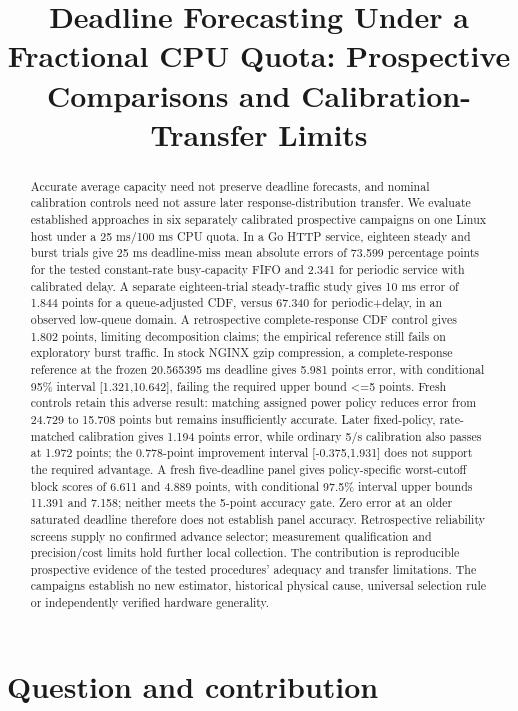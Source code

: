\documentclass[11pt,a4paper]{article}
\title{Deadline Forecasting Under a Fractional CPU Quota: Prospective Comparisons and Calibration-Transfer Limits}
\author{}
\date{}
\begin{document}
\maketitle
\begin{abstract}

Accurate average capacity need not preserve deadline forecasts, and nominal
calibration controls need not assure later response-distribution transfer.
We evaluate established approaches in six separately calibrated prospective
campaigns on one Linux host under a 25 ms/100 ms CPU quota. In a Go HTTP
service, eighteen steady and burst trials give 25 ms deadline-miss mean absolute
errors of 73.599 percentage points for the tested constant-rate busy-capacity
FIFO and 2.341 for periodic service with calibrated delay. A separate eighteen-trial
steady-traffic study gives 10 ms error of 1.844 points for a queue-adjusted CDF,
versus 67.340 for periodic+delay, in an observed low-queue domain. A retrospective
complete-response CDF control gives 1.802 points, limiting decomposition claims;
the empirical reference still fails on exploratory burst traffic. In stock
NGINX gzip compression, a complete-response reference at the frozen 20.565395 ms
deadline gives 5.981 points error, with conditional 95\% interval [1.321,10.642],
failing the required upper bound <=5 points. Fresh controls retain this adverse
result: matching assigned power policy reduces error from 24.729 to 15.708
points but remains insufficiently accurate. Later fixed-policy, rate-matched
calibration gives 1.194 points error, while ordinary 5/s calibration also passes
at 1.972 points; the 0.778-point improvement interval [-0.375,1.931] does not
support the required advantage. A fresh five-deadline panel gives policy-specific
worst-cutoff block scores of 6.611 and 4.889 points, with conditional 97.5\%
interval upper bounds 11.391 and 7.158; neither meets the 5-point accuracy gate.
Zero error at an older saturated deadline therefore does not establish panel
accuracy. Retrospective reliability screens supply no confirmed advance selector;
measurement qualification and precision/cost limits hold further local collection.
The contribution is reproducible prospective
evidence of the tested procedures' adequacy and transfer limitations. The
campaigns establish no new estimator, historical physical cause, universal
selection rule or independently verified hardware generality.

\end{abstract}
\section{Question and contribution}
\end{document}
